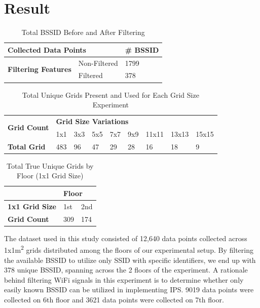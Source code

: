 \documentclass[runningheads]{llncs}
\begin{document}
\section{Result}
\vspace{-30pt}
\begin{table}[htbp]
	\caption{Total BSSID Before and After Filtering}
	\label{tab:bssid_counts}
	\centering
	\begin{tabular}{|l|l|l|}
		\hline
		\multicolumn{2}{|l|}{\textbf{Collected Data Points}} & \textbf{\# BSSID} \\
		\hline
		\multirow{2}{*}{\textbf{Filtering Features}} & Non-Filtered & 1799 \\
		\cline{2-3}
		& Filtered & 378 \\
		\hline
	\end{tabular}
\end{table}
\vspace{-30pt}
\begin{table}[htbp]
	\caption{Total Unique Grids Present and Used for Each Grid Size Experiment}
	\label{tab:grid_size_variations}
	\centering
	\begin{tabular}{|l|l|l|l|l|l|l|l|l|} 
		\hline
		\multirow{2}{*}{\textbf{Grid Count }} & \multicolumn{8}{l|}{\textbf{Grid Size Variations}}   \\ 
		\cline{2-9}
		& 1x1 & 3x3 & 5x5 & 7x7 & 9x9 & 11x11 & 13x13 & 15x15  \\ 
		\hline
		\textbf{Total Grid}                   & 483 & 96  & 47  & 29  & 28  & 16    & 18    & 9      \\
		\hline
	\end{tabular}
\end{table}
\vspace{-30pt}
\begin{table}[htbp]
	\caption{Total True Unique Grids by Floor (1x1 Grid Size)}
	\label{tab:true_unique_grid}
	\centering
	\begin{tabular}{|l|l|l|} 
		\hline
		& \multicolumn{2}{l|}{\textbf{Floor}}  \\ 
		\hline
		\textbf{1x1 Grid Size} & 1st & 2nd                            \\ 
		\hline
		\textbf{Grid Count}    & 309 & 174                            \\
		\hline
	\end{tabular}
\end{table}

The dataset used in this study consisted of 12,640 data points collected across 1x1m\textsuperscript{2} grids distributed among the floors of our experimental setup. By filtering the available BSSID to utilize only SSID with specific identifiers, we end up with 378 unique BSSID, spanning across the 2 floors of the experiment. A rationale behind filtering WiFi signals in this experiment is to determine whether only easily known BSSID can be utilized in implementing IPS. 9019 data points were collected on 6th floor and 3621 data points were collected on 7th floor.
\end{document}
